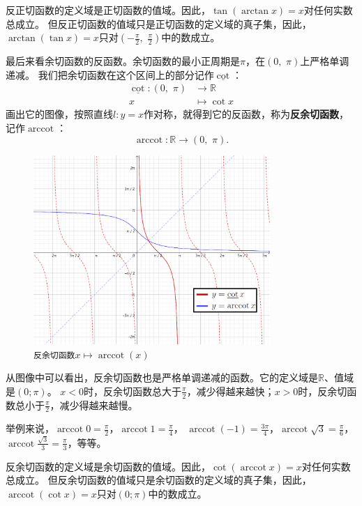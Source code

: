 \documentclass[12pt,UTF8]{ctexbook}
\newcommand{\arccot}{\operatorname{arccot}}
\begin{document}
反正切函数的定义域是正切函数的值域。因此，$\tan{(\arctan{x})} = x$对任何实数总成立。
但反正切函数的值域只是正切函数的定义域的真子集，因此，$\arctan{(\tan{x})} = x$只对$(-\frac{\pi}{2}, \,\, \frac{\pi}{2})$中的数成立。

最后来看余切函数的反函数。余切函数的最小正周期是$\pi$，在$(0, \,\, \pi)$上严格单调递减。
我们把余切函数在这个区间上的部分记作$\underline{\cot}$：
\begin{align*}
    \underline{\cot} : (0, \,\, \pi) &\rightarrow \mathbb{R}  \\
                                   x &\mapsto \cot{x} 
\end{align*}
画出它的图像，按照直线$l: y = x$作对称，就得到它的反函数，称为\textbf{反余切函数}，记作$\arccot$：
$$ \arccot : \mathbb{R} \rightarrow (0, \,\, \pi) . $$

\begin{figure}[h] %
    \vspace{4pt}
    \centering
    \includegraphics[width=0.8\textwidth]{tu/反余切函数1.png}
    \caption*{\texttt{反余切函数}$x\mapsto \arccot(x)$}
\end{figure}

从图像中可以看出，反余切函数也是严格单调递减的函数。它的定义域是$\mathbb{R}$、值域是$(0; \pi)$。
$x < 0$时，反余切函数总大于$\frac{\pi}{2}$，减少得越来越快；$x > 0$时，反余切函数总小于$\frac{\pi}{2}$，减少得越来越慢。

举例来说，$\arccot{0} = \frac{\pi}{2}$，$\arccot{1} = \frac{\pi}{4}$，
$\arccot{(-1)} = \frac{3\pi}{4}$，$\arccot{\sqrt{3}} = \frac{\pi}{6}$，$\arccot{\frac{\sqrt{3}}{3}} = \frac{\pi}{3}$，等等。

反余切函数的定义域是余切函数的值域。因此，$\cot{(\arccot{x})} = x$对任何实数总成立。
但反余切函数的值域只是余切函数的定义域的真子集，因此，$\arccot{(\cot{x})} = x$只对$(0; \pi)$中的数成立。
\end{document}
